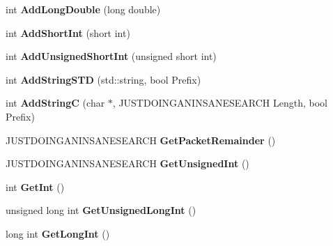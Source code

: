 \begin{DoxyCompactItemize}
\item 
\hypertarget{classcl_packet_aa4e2ffa25f2ed629d4fb10296ab5524f}{
int {\bfseries AddLongDouble} (long double)}
\label{classcl_packet_aa4e2ffa25f2ed629d4fb10296ab5524f}

\item 
\hypertarget{classcl_packet_aacce8bbbbbe2185946aa74ceb0c6c3b1}{
int {\bfseries AddShortInt} (short int)}
\label{classcl_packet_aacce8bbbbbe2185946aa74ceb0c6c3b1}

\item 
\hypertarget{classcl_packet_ab0fba72d2270c3ea2a851c7c51ded05a}{
int {\bfseries AddUnsignedShortInt} (unsigned short int)}
\label{classcl_packet_ab0fba72d2270c3ea2a851c7c51ded05a}

\item 
\hypertarget{classcl_packet_a84b85c9831ffbf1f6241f21a7318e14a}{
int {\bfseries AddStringSTD} (std::string, bool Prefix)}
\label{classcl_packet_a84b85c9831ffbf1f6241f21a7318e14a}

\item 
\hypertarget{classcl_packet_a17908725bf86796360022017ca245074}{
int {\bfseries AddStringC} (char $\ast$, JUSTDOINGANINSANESEARCH Length, bool Prefix)}
\label{classcl_packet_a17908725bf86796360022017ca245074}

\item 
\hypertarget{classcl_packet_a102dffa040db87e4df0cdb707a95096e}{
JUSTDOINGANINSANESEARCH {\bfseries GetPacketRemainder} ()}
\label{classcl_packet_a102dffa040db87e4df0cdb707a95096e}

\item 
\hypertarget{classcl_packet_a4cfc5028f97546bd041f9b768f07a607}{
JUSTDOINGANINSANESEARCH {\bfseries GetUnsignedInt} ()}
\label{classcl_packet_a4cfc5028f97546bd041f9b768f07a607}

\item 
\hypertarget{classcl_packet_a7a738a18ededc187bb5c7fc110852c79}{
int {\bfseries GetInt} ()}
\label{classcl_packet_a7a738a18ededc187bb5c7fc110852c79}

\item 
\hypertarget{classcl_packet_a9189d97b72229cb9785cacdef2f9ffcd}{
unsigned long int {\bfseries GetUnsignedLongInt} ()}
\label{classcl_packet_a9189d97b72229cb9785cacdef2f9ffcd}

\item 
\hypertarget{classcl_packet_a4f5591870a456edd30c8292e060821f8}{
long int {\bfseries GetLongInt} ()}
\label{classcl_packet_a4f5591870a456edd30c8292e060821f8}


\end{DoxyCompactItemize}
